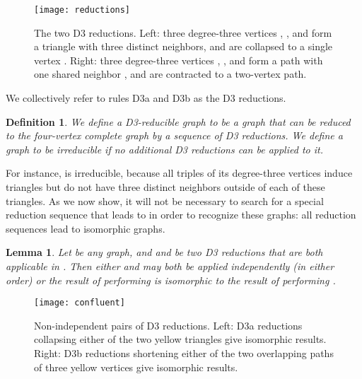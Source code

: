 \documentclass{article}
\newtheorem{lemma}{Lemma}
\newtheorem{definition}{Definition}
\begin{document}
\begin{figure}[t]
\centering
\texttt{[image: reductions]}
\caption{The two D3 reductions. Left: three degree-three vertices , , and  form a triangle with three distinct neighbors, and are collapsed to a single vertex . Right: three degree-three vertices , , and  form a path with one shared neighbor , and are contracted to a two-vertex path.}
\label{fig:reductions}
\end{figure}

We collectively refer to rules D3a and D3b as the D3 reductions.

\begin{definition}
We define a \emph{D3-reducible graph} to be a graph that can be reduced to the four-vertex complete graph  by a sequence of D3 reductions. We define a graph to be \emph{irreducible} if no additional D3 reductions can be applied to it.
\end{definition}

For instance,  is irreducible, because all triples of its degree-three vertices induce triangles but do not have three distinct neighbors outside of each of these triangles.
As we now show, it will not be necessary to search for a special reduction sequence that leads to  in order to recognize these graphs: all reduction sequences lead to isomorphic graphs.

\begin{lemma}
\label{lem:interchangeable}
Let  be any graph, and  and  be two D3 reductions that are both applicable in .
Then either  and  may both be applied independently (in either order) or the result of performing  is isomorphic to the result of performing .
\end{lemma}

\begin{figure}[b]
\centering
\texttt{[image: confluent]}
\caption{Non-independent pairs of D3 reductions. Left: D3a reductions collapsing either of the two yellow triangles give isomorphic results. Right: D3b reductions shortening either of the two overlapping paths of three yellow vertices give isomorphic results.}
\label{fig:confluent}
\end{figure}
\end{document}
